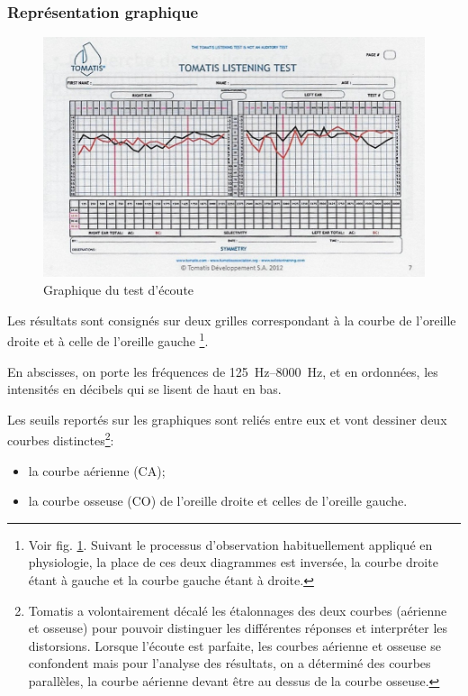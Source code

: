 \subsubsection{Représentation graphique}

\begin{figure}
	\centering
	\includegraphics[width=0.7\linewidth]{images/tomatisListeningTest}
	\caption[Graphique du test d'écoute]{Graphique du test d'écoute}
	\label{fig:tomatislisteningtest}
\end{figure}

Les résultats sont consignés sur deux grilles correspondant à la courbe
de l'oreille droite et à celle de l'oreille gauche%
\footnote{Voir fig. \ref{fig:tomatislisteningtest}. Suivant le processus d'observation habituellement appliqué en physiologie,
la place de ces deux diagrammes est inversée, la courbe droite étant
à gauche et la courbe gauche étant à droite.}.

En abscisses, on porte les fréquences de \SIrange{125}{8000}{\Hz}, et en ordonnées,
les intensités en décibels qui se lisent de haut en bas. 

Les seuils reportés sur les graphiques sont reliés entre eux et vont
dessiner deux courbes distinctes\footnote{Tomatis a volontairement décalé les étalonnages des deux courbes (aérienne
	et osseuse) pour pouvoir distinguer les différentes réponses et interpréter
	les distorsions. Lorsque l'écoute est parfaite, les
	courbes aérienne et osseuse se confondent mais pour l'analyse des
	résultats, on a déterminé des courbes parallèles, la courbe aérienne
	devant être au dessus de la courbe osseuse.}: 
\begin{itemize}
	\item la courbe aérienne (CA);
	\item la courbe osseuse (CO) de l'oreille droite et celles de l'oreille gauche.
\end{itemize}



